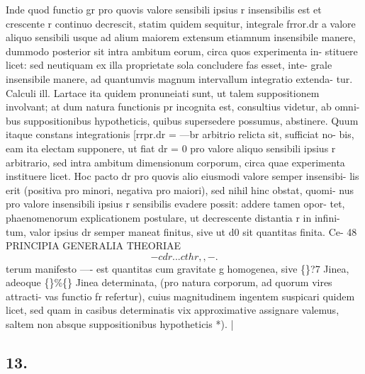 \documentclass[12pt,a4paper]{article}
\begin{document}
Inde quod functio gr pro quovis valore sensibili ipsius r insensibilis est et
crescente r continuo decrescit, statim quidem sequitur, integrale frror.dr a
valore aliquo sensibili usque ad alium maiorem extensum etiamnum insensibile
manere, dummodo posterior sit intra ambitum eorum, circa quos experimenta in-
stituere licet: sed neutiquam ex illa proprietate sola concludere fas esset, inte-
grale insensibile manere, ad quantumvis magnum intervallum integratio extenda-
tur. Calculi ill. Lartace ita quidem pronuneiati sunt, ut talem suppositionem
involvant; at dum natura functionis pr incognita est, consultius videtur, ab omni-
bus suppositionibus hypotheticis, quibus supersedere possumus, abstinere.      Quum
itaque constans integrationis [rrpr.dr = ---br arbitrio relicta sit, sufficiat no-
bis, eam ita electam supponere, ut fiat dr = 0 pro valore aliquo sensibili ipsius
r arbitrario, sed intra ambitum dimensionum corporum,          circa quae experimenta
instituere licet.   Hoc pacto dr pro quovis alio eiusmodi valore semper insensibi-
lis erit (positiva pro minori, negativa pro maiori), sed nihil hinc obstat, quomi-
nus pro valore insensibili ipsius r sensibilis evadere possit: addere tamen opor-
tet, phaenomenorum explicationem postulare, ut decrescente distantia r in infini-
tum, valor ipsius dr semper maneat finitus, sive ut d0 sit quantitas finita.      Ce-
48                                   PRINCIPIA GENERALIA THEORIAE
\[              -        cdr                  .                   .                                 .    cthr   ,,-.\]
terum manifesto ---- est quantitas cum gravitate g homogenea, sive \textdegree\{\}?7 Jinea,
adeoque \textdegree\{\}\%\textdegree\{\} Jinea determinata, (pro natura corporum, ad quorum vires attracti-
vas functio fr refertur), cuius magnitudinem ingentem suspicari quidem licet,
sed quam in casibus determinatis vix approximative assignare valemus, saltem non
absque suppositionibus hypotheticis *).                                                    |


\subsection*{13.}
\end{document}
